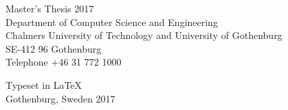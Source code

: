 Master's Thesis 2017\\	%
Department of Computer Science and Engineering\\
Chalmers University of Technology
and University of Gothenburg\\
SE-412 96 Gothenburg\\
Telephone +46 31 772 1000 \setlength{\parskip}{0.5cm}

\vfill


Typeset in \LaTeX \\
Gothenburg, Sweden 2017

